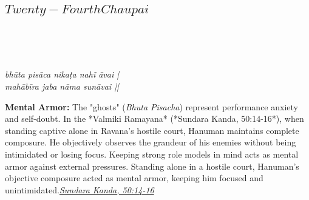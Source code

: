 
\newpage

\subsection*{ \(Twenty-Fourth Chaupai\)}

\begin{minipage}[t]{0.55\textwidth}
\vspace{0pt}

{\large \linespread{1.5}\selectfont
{}\\
\par}

\vspace{0.5em}

{\large \linespread{1.5}\selectfont
{}\\
\par}

\vspace{0.5em}

{\large \linespread{1.3}\selectfont
\textit{bhūta pisāca nikaṭa nahĩ āvai |}\\
\textit{mahābīra jaba nāma sunāvai ||}
\par}
\end{minipage}%
\hfill
\begin{minipage}[t]{0.42\textwidth}
\vspace{0pt}
\begin{tcolorbox}[anchorbox]
\textbf{Mental Armor:} The "ghosts" (\textit{Bhuta Pisacha}) represent performance anxiety and self-doubt. In the *Valmiki Ramayana* (*Sundara Kanda, 50:14-16*), when standing captive alone in Ravana's hostile court, Hanuman maintains complete composure. He objectively observes the grandeur of his enemies without being intimidated or losing focus. Keeping strong role models in mind acts as mental armor against external pressures.
\vspace{0.5em}\newline Standing alone in a hostile court, Hanuman's objective composure acted as mental armor, keeping him focused and unintimidated.\newline\null\hfill\href{https://www.valmiki.iitk.ac.in/sloka?field_kanda_tid=5&language=dv&field_sarga_value=50}{\textit{Sundara Kanda, 50:14-16}}
\end{tcolorbox}
\end{minipage}

